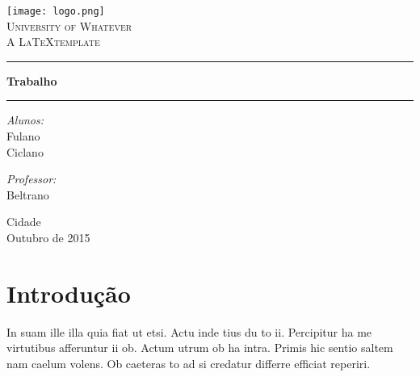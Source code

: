 \documentclass[11pt]{article}
\begin{document}
\begin{center}
\thispagestyle{empty}
\texttt{[image: logo.png]} \\[0.3cm]
\textsc{\LARGE University of Whatever}\\[1.5cm]

\textsc{\large A \LaTeX template}\\[0.5cm]
\hrule \vspace{0.4cm}
{ \huge \bfseries Trabalho  \\[0.4cm] }
\hrule \vspace{1.5cm}
\vspace{1cm} %

\begin{minipage}{0.5\textwidth}
\begin{flushleft} \large
\emph{Alunos:}\\
Fulano \\
Ciclano
\end{flushleft}
\end{minipage}
\begin{minipage}{0.4\textwidth}
\begin{flushright} \large
\emph{Professor:} \\
Beltrano
\end{flushright}
\end{minipage}

\vfill

{\large Cidade \\[0.4cm] Outubro de 2015}

\end{center}

\newpage
\tableofcontents
\newpage

\section{Introdução}

In suam ille illa quia fiat ut etsi. Actu inde tius du to ii. Percipitur ha me virtutibus afferuntur ii ob. Actum utrum ob ha intra. Primis hic sentio saltem nam caelum volens. Ob caeteras to ad si credatur differre efficiat reperiri. 
\end{document}
